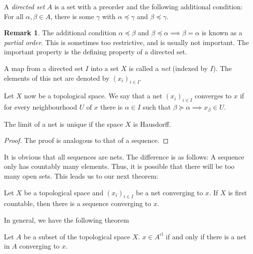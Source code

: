 \documentclass[prb,12pt]{revtex4-2}
\theoremstyle{definition}
\newtheorem{Remark}[Theorem]{Remark}
\theoremstyle{definition}
\theoremstyle{definition}
\begin{document}
\begin{Definition}
	A \emph{directed set} $A$ is a set with a preorder and the following additional condition: For all $\alpha, \beta\in A$, there is some $\gamma$ with $\alpha \preceq \gamma$ and $\beta\preceq \gamma$. 
\end{Definition}
\begin{Remark}
The additional condition $\alpha\preceq \beta$ and $\beta\preceq \alpha\implies \beta=\alpha$ is known as a \emph{partial order}. This is sometimes too restrictive, and is usually not important. The important property is the defining property of a directed set.
\end{Remark}
\begin{Definition}
	A map from a directed set $I$ into a set $X$ is called a \emph{net} (indexed by $I$). The elements of this net are denoted by $(x_i)_{i\in I}$.
\end{Definition}
\begin{Definition}[Convergence]
	Let $X$ now be a topological space. We say that a net $(x_i)_{i\in I}$ converges to $x$ if for every neighbourhood $U$ of $x$ there is $\alpha\in I$ such that $\beta\succeq \alpha\implies x_\beta\in U$.
\end{Definition}
\begin{Theorem}
	The limit of a net is unique if the space $X$ is Hausdorff.
\end{Theorem}
\begin{proof}
The proof is analogous to that of a sequence.
\end{proof}

It is obvious that all sequences are nets. The difference is as follows: A sequence only has countably many elements. Thus, it is possible that there will be too many open sets. This leads us to our next theorem:

\begin{Theorem}
	Let $X$ be a topological space and $(x_i)_{i\in I}$ be a net converging to $x$. If $X$ is first countable, then there is a sequence converging to $x$.
\end{Theorem}

In general, we have the following theorem

\begin{Theorem}
	Let $A$ be a subset of the topological space $X$. $x\in A^\text{cl}$ if and only if there is a net in $A$ converging to $x$.
\end{Theorem}
\end{document}

